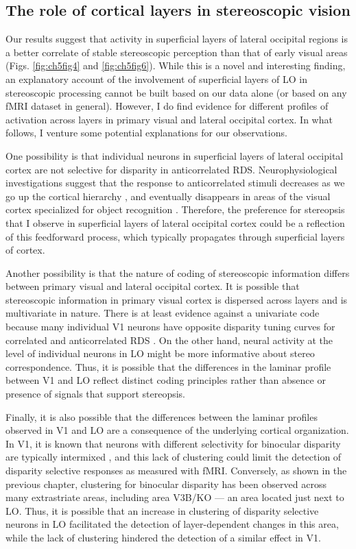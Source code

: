 \subsection{The role of cortical layers in stereoscopic vision}

Our results suggest that activity in superficial layers of lateral occipital regions is a better correlate of stable stereoscopic perception than that of early visual areas (Figs. \ref{fig:ch5fig4} and \ref{fig:ch5fig6}). While this is a novel and interesting finding, an explanatory account of the involvement of superficial layers of LO in stereoscopic processing cannot be built based on our data alone (or based on any fMRI dataset in general). However, I do find evidence for different profiles of activation across layers in primary visual and lateral occipital cortex. In what follows, I venture some potential explanations for our observations.

One possibility is that individual neurons in superficial layers of lateral occipital cortex are not selective for disparity in anticorrelated RDS. Neurophysiological investigations suggest that the response to anticorrelated stimuli decreases as we go up the cortical hierarchy \cite{Cumming:1997ve,Tanabe:2004mw}, and eventually disappears in areas of the visual cortex specialized for object recognition \cite{Janssen:2003fk}. Therefore, the preference for stereopsis that I observe in superficial layers of lateral occipital cortex could be a reflection of this feedforward process, which typically propagates through superficial layers of cortex.

Another possibility is that the nature of coding of stereoscopic information differs between primary visual and lateral occipital cortex. It is possible that stereoscopic information in primary visual cortex is dispersed across layers and is multivariate in nature. There is at least evidence against a univariate code because many individual V1 neurons have opposite disparity tuning curves for correlated and anticorrelated RDS \cite{Cumming:1997ve}. On the other hand, neural activity at the level of individual neurons in LO might be more informative about stereo correspondence. Thus, it is possible that the differences in the laminar profile between V1 and LO reflect distinct coding principles rather than absence or presence of signals that support stereopsis.

Finally, it is also possible that the differences between the laminar profiles observed in V1 and LO are a consequence of the underlying cortical organization. In V1, it is known that neurons with different selectivity for binocular disparity are typically intermixed \cite{Prince:2002cr}, and this lack of clustering could limit the detection of disparity selective responses as measured with fMRI. Conversely, as shown in the previous chapter, clustering for binocular disparity has been observed across many extrastriate areas, including area V3B/KO --- an area located just next to LO. Thus, it is possible that an increase in clustering of disparity selective neurons in LO facilitated the detection of layer-dependent changes in this area, while the lack of clustering hindered the detection of a similar effect in V1.


